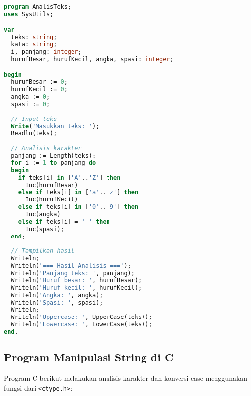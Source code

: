 \documentclass[../main.tex]{subfiles}
\begin{document}
\begin{lstlisting}[language=Pascal, caption={Program analisis teks di Pascal}]
program AnalisTeks;
uses SysUtils;

var
  teks: string;
  kata: string;
  i, panjang: integer;
  hurufBesar, hurufKecil, angka, spasi: integer;

begin
  hurufBesar := 0;
  hurufKecil := 0;
  angka := 0;
  spasi := 0;
  
  // Input teks
  Write('Masukkan teks: ');
  Readln(teks);
  
  // Analisis karakter
  panjang := Length(teks);
  for i := 1 to panjang do
  begin
    if teks[i] in ['A'..'Z'] then
      Inc(hurufBesar)
    else if teks[i] in ['a'..'z'] then
      Inc(hurufKecil)
    else if teks[i] in ['0'..'9'] then
      Inc(angka)
    else if teks[i] = ' ' then
      Inc(spasi);
  end;
  
  // Tampilkan hasil
  Writeln;
  Writeln('=== Hasil Analisis ===');
  Writeln('Panjang teks: ', panjang);
  Writeln('Huruf besar: ', hurufBesar);
  Writeln('Huruf kecil: ', hurufKecil);
  Writeln('Angka: ', angka);
  Writeln('Spasi: ', spasi);
  Writeln;
  Writeln('Uppercase: ', UpperCase(teks));
  Writeln('Lowercase: ', LowerCase(teks));
end.
\end{lstlisting}

\subsection{Program Manipulasi String di C}

Program C berikut melakukan analisis karakter dan konversi case menggunakan fungsi dari \texttt{<ctype.h>}:
\end{document}
